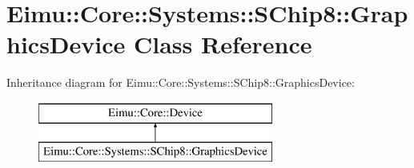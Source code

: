 \hypertarget{class_eimu_1_1_core_1_1_systems_1_1_s_chip8_1_1_graphics_device}{
\section{Eimu::Core::Systems::SChip8::GraphicsDevice Class Reference}
\label{class_eimu_1_1_core_1_1_systems_1_1_s_chip8_1_1_graphics_device}
}
Inheritance diagram for Eimu::Core::Systems::SChip8::GraphicsDevice:\begin{figure}[H]
\begin{center}
\leavevmode
\includegraphics[height=2.000000cm]{class_eimu_1_1_core_1_1_systems_1_1_s_chip8_1_1_graphics_device}
\end{center}
\end{figure}
